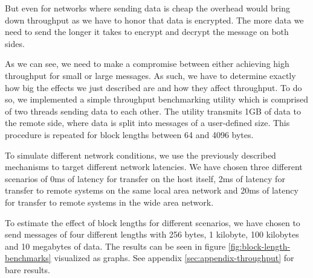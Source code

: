 But even for networks where sending data is cheap the overhead would bring down throughput as we have to honor that data is encrypted.
The more data we need to send the longer it takes to encrypt and decrypt the message on both sides.

\medskip

As we can see, we need to make a compromise between either achieving high throughput for small or large messages.
As such, we have to determine exactly how big the effects we just described are and how they affect throughput.
To do so, we implemented a simple throughput benchmarking utility which is comprised of two threads sending data to each other.
The utility transmits 1GB of data to the remote side, where data is split into messages of a user-defined size.
This procedure is repeated for block lengths between 64 and 4096 bytes.

To simulate different network conditions, we use the previously described mechanisms to target different network latencies.
We have chosen three different scenarios of 0ms of latency for transfer on the host itself, 2ms of latency for transfer to remote systems on the same local area network and 20ms of latency for transfer to remote systems in the wide area network.

To estimate the effect of block lengths for different scenarios, we have chosen to send messages of four different lengths with 256 bytes, 1 kilobyte, 100 kilobytes and 10 megabytes of data.
The results can be seen in figure \ref{fig:block-length-benchmarks} visualized as graphs.
See appendix \ref{sec:appendix-throughput} for bare results.

